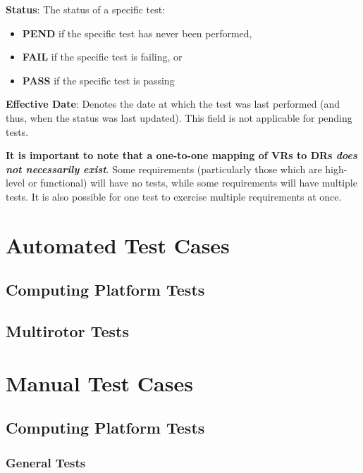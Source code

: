 \documentclass[10pt,letterpaper]{article}
\begin{document}
\textbf{Status}: The status of a specific test:
\begin{itemize}
	\item \textbf{PEND} if the specific test has never been performed,
	\item \textbf{FAIL} if the specific test is failing, or
	\item \textbf{PASS} if the specific test is passing
\end{itemize}

\textbf{Effective Date}: Denotes the date at which the test was last performed (and thus, when the status was last updated). This field is not applicable for pending tests.

\textbf{It is important to note that a one-to-one mapping of VRs to DRs \textit{does not necessarily exist}}. Some requirements (particularly those which are high-level or functional) will have no tests, while some requirements will have multiple tests. It is also possible for one test to exercise multiple requirements at once.

\section{Automated Test Cases}

\subsection{Computing Platform Tests}

\subsection{Multirotor Tests}

\section{Manual Test Cases}

\subsection{Computing Platform Tests}
\subsubsection{General Tests}
\end{document}
